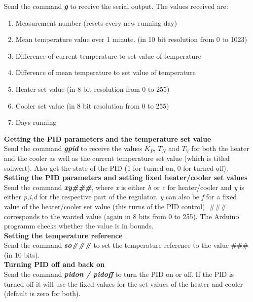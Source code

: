 \documentclass[12pt]{scrartcl}
\begin{document}
      Send the command \textbf{\textit{g}} to receive the serial output. The values
      received are:
      \begin{enumerate}
        \item Measurement number (resets every new running day)
        \item Mean temperature value over 1 minute. (in 10 bit resolution from
          0 to 1023)
        \item Difference of current temperature to set value of temperature
        \item Difference of mean temperature to set value of temperature
        \item Heater set value (in 8 bit resolution from 0 to 255)
        \item Cooler set value (in 8 bit resolution from 0 to 255)
        \item Days running
      \end{enumerate}

      \noindent\textbf{Getting the PID parameters and the temperature set value} \\
      Send the command \textbf{\textit{gpid}} to receive the values $K_P$, $T_N$
      and $T_V$ for both the heater and the cooler as well as the current
      temperature set value (which is titled sollwert). Also get the state of
      the PID (1 for turned on, 0 for turned off).\\

      \noindent\textbf{Setting the PID parameters and setting fixed heater/cooler
      set values} \\
      Send the command \textbf{\textit{xy\#\#\#}}, where \textit{x} is either
      \textit{h} or \textit{c} for heater/cooler and \textit{y} is either
      \textit{p,i,d} for the respective part of the regulator. \textit{y} can
      also be \textit{f} for a fixed value of the heater/cooler set value (this
      turns of the PID control). \#\#\# corresponds to the wanted value (again in
      8 bits from 0 to 255). The Arduino programm checks whether the value is
      in bounds.\\

      \noindent\textbf{Setting the temperature reference}\\
      Send the command \textbf{\textit{so\#\#\#}} to set the temperature
      reference to the value \#\#\# (in 10 bits).\\

      \noindent\textbf{Turning PID off and back on}\\
      Send the command \textbf{\textit{pidon / pidoff}} to turn the PID on or off.
      If the PID is turned off it will use the fixed values for the set values of
      the heater and cooler (default is zero for both).\\
\end{document}
